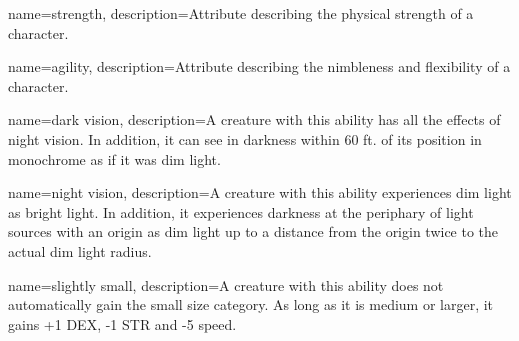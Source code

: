 {
    name=strength,
    description={Attribute describing the physical strength of a character.}
}

{
    name=agility,
    description={Attribute describing the nimbleness and flexibility of a
        character.}
}

{
    name={dark vision},
    description={A creature with this ability has all the effects of night
        vision. In addition, it can see in darkness within 60 ft. of its
        position in monochrome as if it was dim light.}
}

{
    name={night vision},
    description={A creature with this ability experiences dim light as bright
        light. In addition, it experiences darkness at the periphary of light
        sources with an origin as dim light up to a distance from the origin 
        twice to the actual dim light radius.}
}

{
    name={slightly small},
    description={A creature with this ability does not automatically gain the
        small size category. As long as it is medium or larger, it gains +1
        DEX, -1 STR and -5 speed.}
}
